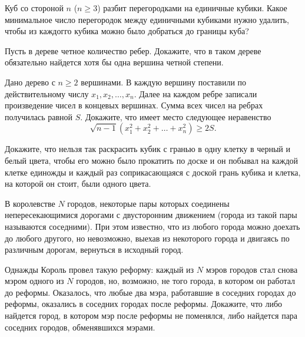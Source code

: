 \begin{exersize}
	Куб со стороной $n$ ($n \geqslant 3$) разбит перегородками на единичные кубики. Какое минимальное число перегородок между единичными кубиками нужно удалить, чтобы из каждогго кубика можно было добраться до границы куба?
\end{exersize}	

\begin{exersize}
	Пусть в дереве четное количество ребер. Докажите, что в таком дереве обязательно найдется хотя бы одна вершина четной степени.
\end{exersize}	


\begin{exersize}
	Дано дерево с $n \geqslant 2$ вершинами. В каждую вершину поставили по действительному числу $x_1, x_2, \dots, x_n$. Далее на каждом ребре записали произведение чисел в концевых вершинах. Сумма всех чисел на ребрах получилась равной $S$. Докажите, что имеет место следующее неравенство $$\sqrt{n-1} (x_1^2 + x_2^2 + \dots + x_n^2) \geqslant 2S.$$
\end{exersize}	

\begin{exersize}
	Докажите, что нельзя так раскрасить кубик с гранью в одну клетку в черный и белый цвета, чтобы его можно было прокатить по доске и он побывал на каждой клетке единожды и каждый раз соприкасающаяся с доской грань кубика и клетка, на которой он стоит, были одного цвета.
\end{exersize}	

\begin{exersize}
	В королевстве $N$ городов, некоторые пары которых соединены непересекающимися дорогами с двусторонним движением (города из такой пары называются соседними). При этом известно, что из любого города можно доехать до любого другого, но невозможно, выехав из некоторого города и двигаясь по различным дорогам, вернуться в исходный город.
	
	Однажды Король провел такую реформу: каждый из $N$ мэров городов стал снова мэром одного из $N$ городов, но, возможно, не того города, в котором он работал до реформы. Оказалось, что любые два мэра, работавшие в соседних городах до реформы, оказались в соседних городах после реформы. Докажите, что либо найдется город, в котором мэр после реформы не поменялся, либо найдется пара соседних городов, обменявшихся мэрами.
\end{exersize}	 
